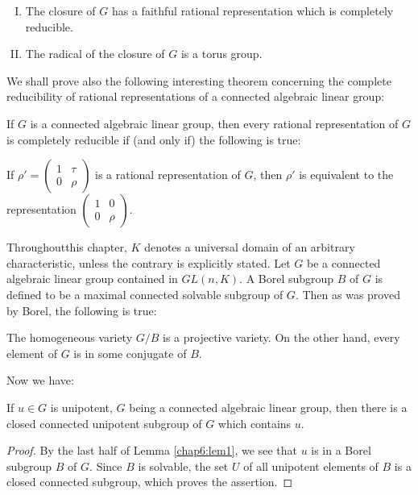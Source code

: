 \begin{enumerate}[(I)]
\item The closure of $G$ has a faithful rational representation which
  is completely reducible. 
\item The radical of the closure of $G$ is a torus group.
\end{enumerate}

We shall prove also the following interesting theorem concerning the
complete reducibility of rational representations of a connected
algebraic linear group: 

If $G$ is a connected algebraic linear group, then every rational
representation of $G$ is completely reducible if (and only if) the
following is true: 

If $\rho'= \begin{pmatrix} 1 & \tau \\ 0 & \rho \end{pmatrix}$ is a
rational representation of $G$, then $\rho'$ is equivalent to the
representation $\begin{pmatrix} 1 & 0 \\ 0 & \rho \end{pmatrix}$. 

\medskip
{}

Throughout\pageoriginale this chapter, $K$ denotes a universal domain
of an arbitrary characteristic, unless the contrary is explicitly
stated.  Let $G$ be a connected algebraic linear group contained in
$GL(n, K)$. A Borel subgroup $B$ of $G$ is defined to be a maximal
connected solvable subgroup of $G$.  Then as was proved by Borel, the
following is true:    

\setcounter{lem}{0}
\begin{lem}\label{chap6:lem1}%
  The homogeneous variety $G/B$ is a projective variety.  On the other
  hand, every element of $G$ is in some conjugate of $B$. 
\end{lem}
 
Now we have:	

\begin{lem}\label{chap6:lem2}%
  If $u \in G$ is unipotent, $G$ being a connected algebraic
  linear group, then there is a closed connected unipotent subgroup of
  $G$ which contains $u$. 
\end{lem}

\begin{proof}
  By the last half of Lemma \ref{chap6:lem1}, we see that $u$ is in a Borel
  subgroup $B$ of $G$.  Since $B$ is solvable, the set $U$ of all
  unipotent elements of $B$ is a closed connected subgroup, which
  proves the assertion. 
\end{proof}

